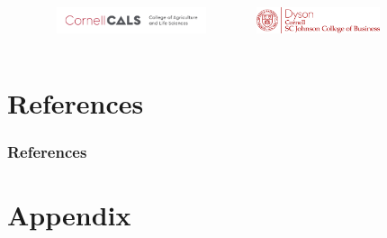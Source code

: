\documentclass[usenames,dvipsnames]{beamer}
\begin{document}
\begin{frame}
\begin{columns}
    \end{columns} \vspace{-12pt}
    \begin{columns}
        \begin{column}{0.05\textwidth}
        \end{column}
        \begin{column}{0.45\textwidth} \raggedright
            \includegraphics[height=22pt]{Logos/Horizontal Wordmark_color.png}
        \end{column}
        \begin{column}{0.45\textwidth}\raggedleft
            \includegraphics[height=22pt]{Logos/Dyson-logo-rgb.png}
        \end{column}
        \begin{column}{0.05\textwidth}
        \end{column}
    \end{columns}
\end{frame}

\section*{References}

\footnotesize
\begin{frame}[allowframebreaks]
        \frametitle{References}\label{references}
        
        
\end{frame}

\section{Appendix}
\end{document}
